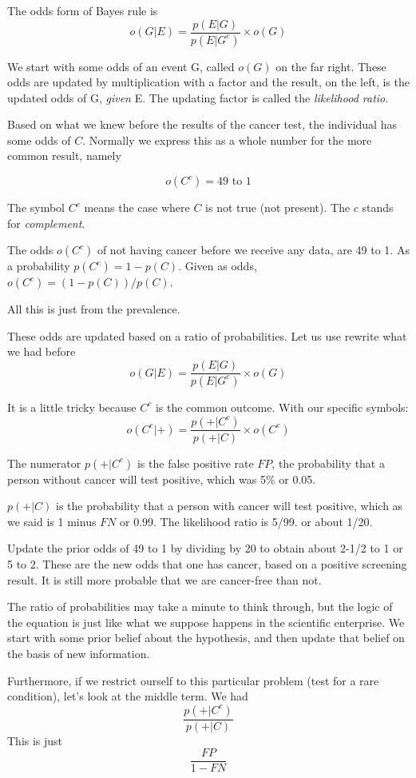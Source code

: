 \documentclass[11pt, oneside]{article}
\begin{document}
The odds form of Bayes rule is
\[ o(G|E) = \frac{p(E|G)}{p(E|G^{c})} \times o(G) \]

We start with some odds of an event G, called $o(G)$ on the far right.  These odds are updated by multiplication with a factor and the result, on the left, is the updated odds of G, \emph{given} E.  The updating factor is called the \emph{likelihood ratio}.

Based on what we knew before the results of the cancer test, the individual has some odds of $C$.  Normally we express this as a whole number for the more common result, namely

\[ o(C^c) = 49 \text{ to } 1 \]

The symbol $C^c$ means the case where $C$ is not true (not present).  The $c$ stands for \emph{complement}.

The odds $o(C^c)$ of not having cancer before we receive any data, are 49 to 1.  As a probability $p(C^c) = 1 - p(C)$.  Given as odds, $o(C^c) = (1 - p(C))/p(C)$.

All this is just from the prevalence.  

These odds are updated based on a ratio of probabilities.  Let us use rewrite what we had before
\[ o(G|E) = \frac{p(E|G)}{p(E|G^{c})} \times o(G) \]

It is a little tricky because $C^c$ is the common outcome.  With our specific symbols:
\[ o(C^c|+) = \frac{p(+|C^c)}{p(+|C)} \times o(C^c) \]
  
The numerator $p(+|C^c)$ is the false positive rate $FP$, the probability that a person without cancer will test positive, which was 5\% or 0.05.

$p(+|C)$ is the probability that a person with cancer will test positive, which as we said is 1 minus $FN$ or 0.99.  The likelihood ratio is 5/99. or about 1/20.  

Update the prior odds of 49 to 1 by dividing by 20 to obtain about 2-1/2 to 1 or 5 to 2.  These are the new odds that one has cancer, based on a positive screening result.  It is still more probable that we are cancer-free than not.

The ratio of probabilities may take a minute to think through, but the logic of the equation is just like what we suppose happens in the scientific enterprise.  We start with some prior belief about the hypothesis, and then update that belief on the basis of new information.

Furthermore, if we restrict ourself to this particular problem (test for a rare condition), let's look at the middle term.  We had
\[ \frac{p(+|C^c)}{p(+|C)} \]
This is just
\[ \frac{FP}{1 - FN} \]
\end{document}
